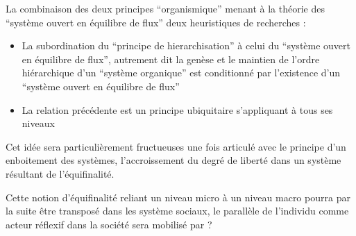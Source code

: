 

La combinaison des deux principes \enquote{organismique} menant à la théorie des \enquote{système ouvert en équilibre de flux} deux heuristiques de recherches \autocite[481]{Pouvreau2013}:
\begin{itemize}
\item La subordination du \enquote{principe de hierarchisation} à celui du \enquote{système ouvert en équilibre de flux}, autrement dit la genèse et le maintien de l’ordre hiérarchique d’un \enquote{système organique} est conditionné par l'existence d'un \enquote{système ouvert en équilibre de flux}
\item  La relation précédente est un principe ubiquitaire s’appliquant à tous ses niveaux
\end{itemize}

Cet idée sera particulièrement fructueuses une fois articulé avec le principe d'un enboitement des systèmes, l'accroissement du degré de liberté dans un système résultant de l'équifinalité.
 \autocite[38]{Bertalanffy1973} \autocite[786-788]{Pouvreau2013}


Cette notion d'équifinalité reliant un niveau micro à un niveau macro pourra par la suite être transposé dans les système sociaux, le parallèle de l'individu comme acteur réflexif dans la société sera mobilisé par ?

